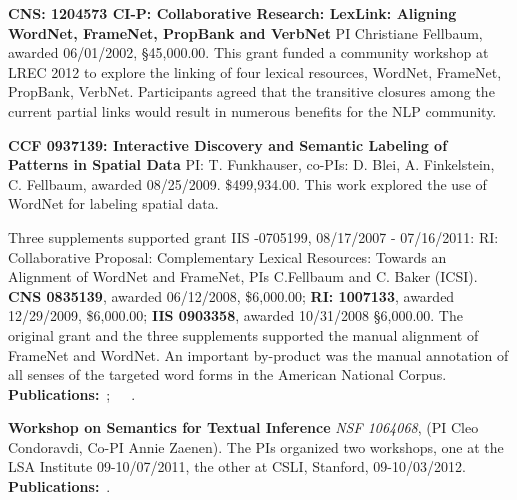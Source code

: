 \documentclass[10pt]{article}
\newcommand{\miniskip}{\vspace*{1mm}}
\begin{document}
\noindent
{\bf CNS: 1204573 CI-P: Collaborative Research: LexLink: Aligning WordNet, FrameNet, PropBank and VerbNet} PI Christiane Fellbaum, awarded 06/01/2002, 
\S45,000.00. This grant funded a community workshop at LREC 2012 to explore the linking of four lexical resources, WordNet, FrameNet, PropBank, VerbNet. 
Participants agreed that the transitive closures among the current partial links would result in numerous benefits for the NLP community. 

\noindent
{\bf CCF 0937139: Interactive Discovery and Semantic Labeling of Patterns in Spatial Data} PI: T. Funkhauser, co-PIs: D. Blei, A. Finkelstein, C. Fellbaum, awarded 08/25/2009.
\$499,934.00. This work explored the use of WordNet for labeling spatial data. 

\noindent
Three supplements supported grant IIS -0705199, 08/17/2007 - 07/16/2011: RI: Collaborative Proposal: Complementary Lexical Resources: 
Towards an Alignment of WordNet and FrameNet, PIs C.Fellbaum and C. Baker (ICSI). 
{\bf CNS 0835139}, awarded 06/12/2008, \$6,000.00; {\bf RI: 1007133}, awarded 12/29/2009, \$6,000.00; {\bf IIS 0903358}, awarded 10/31/2008 \S6,000.00. 
The original grant and the three supplements supported the manual alignment of FrameNet and WordNet. An important by-product was the manual 
annotation of all senses of the targeted word forms in the American National Corpus. {\bf Publications:}~\cite{fellbaumbakerLRE};~\cite{bakerfellbaum2008}~\cite{bakerfellbaum2009}~\cite{demelo2012}.


\noindent
{\bf Workshop on Semantics for Textual Inference}
{\it  NSF  1064068}, (PI Cleo Condoravdi, Co-PI Annie Zaenen). The PIs organized two workshops, one at the LSA Institute 09-10/07/2011, the other at CSLI, Stanford, 09-10/03/2012.
{\bf Publications:}~\cite{Lilt-special-issue}.

 \nocite{zaenen+karttunen:2013}
\nocite{csli-gang-cssp13}
\nocite{csli-gang-cil13}
\nocite{faust-adj-pol-lex}
\end{document}
